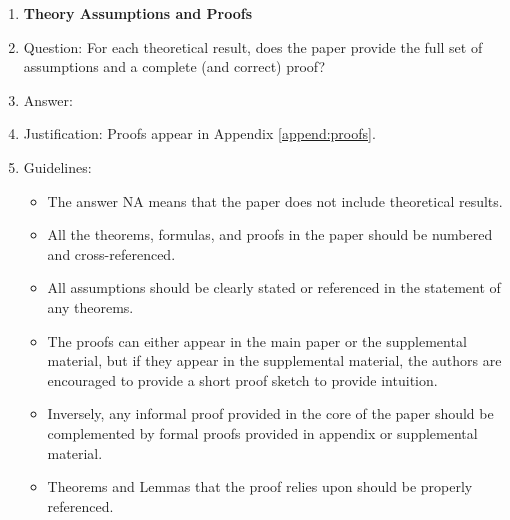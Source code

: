 \documentclass{article}
\theoremstyle{plain}
\theoremstyle{definition}
\theoremstyle{remark}
\begin{document}
\begin{enumerate}
\item {\bf Theory Assumptions and Proofs}
    \item[] Question: For each theoretical result, does the paper provide the full set of assumptions and a complete (and correct) proof?
    \item[] Answer: \answerYes{} %
    \item[] Justification: Proofs appear in Appendix \ref{append:proofs}. 
    \item[] Guidelines:
    \begin{itemize}
        \item The answer NA means that the paper does not include theoretical results. 
        \item All the theorems, formulas, and proofs in the paper should be numbered and cross-referenced.
        \item All assumptions should be clearly stated or referenced in the statement of any theorems.
        \item The proofs can either appear in the main paper or the supplemental material, but if they appear in the supplemental material, the authors are encouraged to provide a short proof sketch to provide intuition. 
        \item Inversely, any informal proof provided in the core of the paper should be complemented by formal proofs provided in appendix or supplemental material.
        \item Theorems and Lemmas that the proof relies upon should be properly referenced. 
    \end{itemize}


\end{enumerate}
\end{document}

